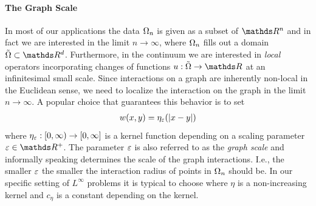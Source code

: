\paragraph{The Graph Scale} In most of our applications the data $\Omega_n$ is given as a subset of $\R^n$ and in fact we are interested in the limit $n\to\infty$, where $\Omega_n$ fills out a domain $\tilde\domain\subset\R^d$. Furthermore, in the continuum we are interested in \emph{local} operators incorporating changes of functions $u:\tilde\domain\to\R$ at an infinitesimal small scale. Since interactions on a graph are inherently non-local in the Euclidean sense, we need to localize the interaction on the graph in the limit $n\to\infty$. A popular choice that guarantees this behavior is to set
%
\begin{align*}
w(x,y) = \eta_{\varepsilon}(\left|x-y\right|)
\end{align*}
%
where $\eta_\varepsilon:[0,\infty)\to [0,\infty]$ is a kernel function depending on a scaling parameter $\gscale\in\R^+$. The parameter $\varepsilon$ is also referred to as the \emph{graph scale} and informally speaking determines the scale of the graph interactions. I.e., the smaller $\varepsilon$ the smaller the interaction radius of points in $\Omega_n$ should be. In our specific setting of $L^\infty$ problems it is typical to choose
%
%
where $\eta$ is a non-increasing kernel and $c_\eta$ is a constant depending on the kernel.
%
\begin{remark}{}{}
%
\end{remark}
%
